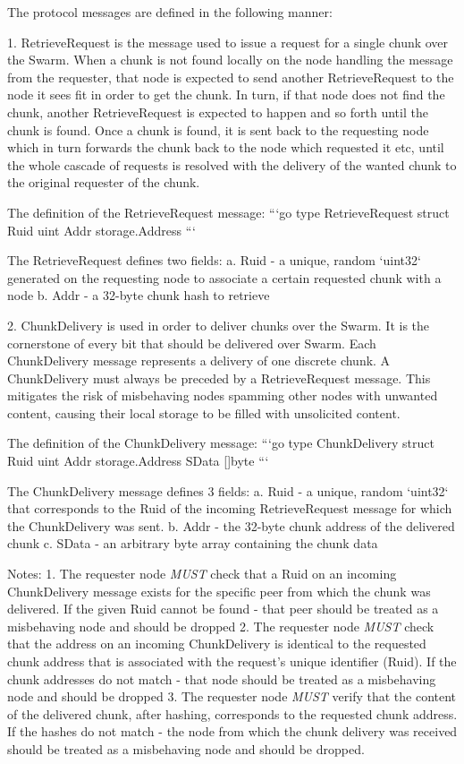 The protocol messages are defined in the following manner:

1. RetrieveRequest is the message used to issue a request for a single chunk over the Swarm. When a chunk is not found locally on the node handling the message from the requester, that node is expected to send another
RetrieveRequest to the node it sees fit in order to get the chunk. In turn, if that node does not find the chunk, another RetrieveRequest is expected to happen and so forth until the chunk is found.
Once a chunk is found, it is sent back to the requesting node which in turn forwards the chunk back to the node which requested it etc, until the whole cascade of requests is resolved with the delivery of the
wanted chunk to the original requester of the chunk.

The definition of the RetrieveRequest message:
```go
type RetrieveRequest struct {
	Ruid uint
	Addr storage.Address
}
```

The RetrieveRequest defines two fields:
a. Ruid - a unique, random `uint32` generated on the requesting node to associate a certain requested chunk with a node
b. Addr - a 32-byte chunk hash to retrieve

2. ChunkDelivery is used in order to deliver chunks over the Swarm. It is the cornerstone of every bit that should be delivered over Swarm. Each ChunkDelivery message represents a delivery of one discrete chunk.
A ChunkDelivery must always be preceded by a RetrieveRequest message. This mitigates the risk of misbehaving nodes spamming other nodes with unwanted content, causing their local storage to be
filled with unsolicited content.

The definition of the ChunkDelivery message:
```go
type ChunkDelivery struct {
	Ruid  uint
	Addr  storage.Address
	SData []byte
}
```

The ChunkDelivery message defines 3 fields:
a. Ruid - a unique, random `uint32` that corresponds to the Ruid of the incoming RetrieveRequest message for which the ChunkDelivery was sent.
b. Addr - the 32-byte chunk address of the delivered chunk
c. SData - an arbitrary byte array containing the chunk data


Notes:
1. The requester node \textit{MUST} check that a Ruid on an incoming ChunkDelivery message exists for the specific peer from which the chunk was delivered. If the given Ruid cannot be found - that peer should be treated as a misbehaving node and should be dropped
2. The requester node \textit{MUST} check that the address on an incoming ChunkDelivery is identical to the requested chunk address that is associated with the request's unique identifier (Ruid). If the chunk addresses do not match - that node should be treated as a misbehaving node and should be dropped
3. The requester node \textit{MUST} verify that the content of the delivered chunk, after hashing, corresponds to the requested chunk address. If the hashes do not match - the node from which the chunk delivery was received should be treated as a misbehaving node and should be dropped.

